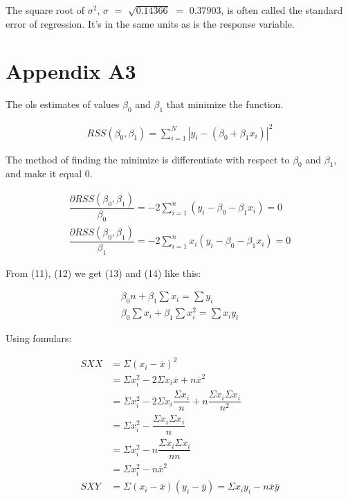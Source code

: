 \documentclass{article}
\begin{document}
    The square root of $\sigma ^ 2$, $\sigma$ $=$ $\sqrt{0.14366}$ $=$ $0.37903$, is often called the standard error of regression. It's in the same units as is the response variable.
    
\section{Appendix A3} 
    The ols estimates of values ${\beta_{0}}$ and ${\beta_{1}}$ that minimize the function.
    
    \begin{align}
        RSS(\beta_{0}, \beta_{1}) = \displaystyle \sum _{i = 1} ^ {N}   |y_{i} - (\beta_{0} + \beta_{1} x_{i})| ^ 2
    \end{align}
    
    The method of finding the minimize is differentiate with respect to $\beta_{0}$ and $\beta_{1}$, and make it equal $0$. 
    
    \begin{align} 
        \dfrac{\partial RSS(\beta_{0}, \beta_{1}) }{\beta_{0}} = -2 \displaystyle \sum _{i=1}^{n}  (y_{i} - \beta_{0} - \beta_{1} x_{i}) = 0
        \\
        \dfrac{\partial RSS(\beta_{0}, \beta_{1}) }{\beta_{1}} = -2 \displaystyle \sum _{i=1}^{n}  x_{i} (y_{i} - \beta_{0} - \beta_{1} x_{i}) = 0
    \end{align}
        
    From (11), (12) we get (13) and (14) like this: 
    
    \begin{align} 
        \beta_{0} n + \beta_{1} \displaystyle \sum x_{i} = \displaystyle \sum y_{i}
        \\
        \beta_{0} \displaystyle \sum x_{i} + \beta_{1} \displaystyle \sum x_{i}^2 = \displaystyle \sum x_{i} y_{i}
    \end{align}
    
    Using fomulars: 
    
     \begin{align} 
        SXX &= \Sigma (x_{i} - \overline{x})^2 \\
        &= \Sigma x_{i}^2 - 2 \Sigma x_{i} \overline{x} + n\overline{x}^2  \nonumber \\
        &= \Sigma x_{i}^2 - 2 \Sigma x_{i} \dfrac{\Sigma x_{i}}{n} + n\dfrac{\Sigma x_{i} \Sigma x_{i}}{n^2}   \nonumber \\
        &= \Sigma x_{i}^2 - \dfrac{\Sigma x_{i} \Sigma x_{i}}{n} \nonumber \\
        &= \Sigma x_{i}^2 - n\dfrac{\Sigma x_{i} \Sigma x_{i}}{n n} \nonumber \\
        &= \Sigma x_{i}^2 - n\overline{x}^2 \nonumber \\
        SXY &= \Sigma (x_{i} - \overline{x})(y_{i} - \overline{y}) = \Sigma x_{i}y_{i} - n\overline{x}\overline{y}
    \end{align}
    
\end{document}

